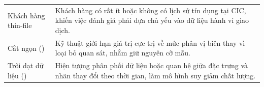 \begin{longtable}{@{}L{4.4cm}L{9.6cm}@{}}
Khách hàng thin-file &
Khách hàng có rất ít hoặc không có lịch sử tín dụng tại CIC, khiến việc đánh giá
phải dựa chủ yếu vào dữ liệu hành vi giao dịch. \\

Cắt ngọn \newline () &
Kỹ thuật giới hạn giá trị cực trị về mức phân vị biên thay vì loại bỏ quan sát,
nhằm giữ nguyên cỡ mẫu. \\

Trôi dạt dữ liệu \newline () &
Hiện tượng phân phối dữ liệu hoặc quan hệ giữa đặc trưng và nhãn thay đổi theo
thời gian, làm mô hình suy giảm chất lượng. \\
\end{longtable}
\endgroup
